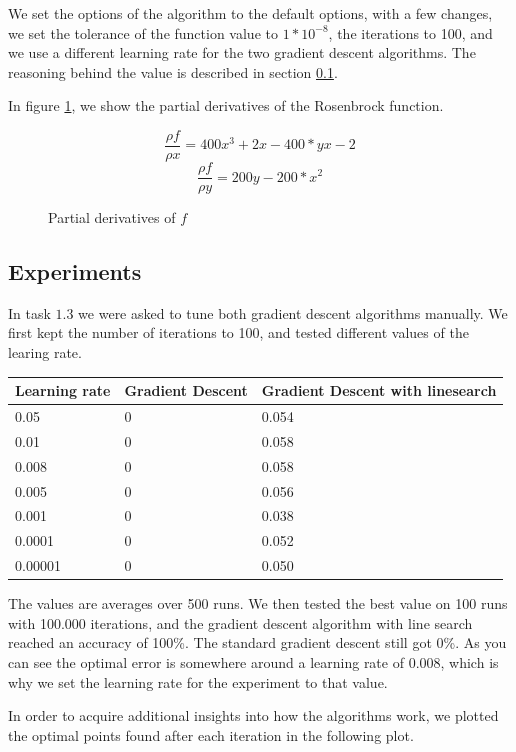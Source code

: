 \documentclass{article}
\begin{document}
We set the options of the algorithm to the default options, with a few changes, we set the tolerance of the function value to $1*10^{-8}$, the iterations to 100, and we use a different learning rate for the two gradient descent algorithms. The reasoning behind the value is described in section \ref{sec:experiments}.

In figure \ref{fig:partdiv}, we show the partial derivatives of the Rosenbrock function.
\begin{figure}[H]
\[\frac{\rho f}{\rho x} = 400x^3 + 2x - 400*yx - 2\]
\[\frac{\rho f}{\rho y} = 200y - 200*x^2\]
\caption{Partial derivatives of $f$}
\label{fig:partdiv}
\end{figure}

\subsection{Experiments}
\label{sec:experiments}
In task $1.3$ we were asked to tune both gradient descent algorithms manually. We first kept the number of iterations to 100, and tested different values of the learing rate.

\begin{table}[H]
	\centering
		\begin{tabular}{l|l|l}
		Learning rate & Gradient Descent & Gradient Descent with linesearch \\
		\hline
		0.05 & 0 & 0.054 \\
		0.01 & 0 & 0.058 \\
		0.008 & 0 & 0.058 \\
		0.005 & 0 & 0.056 \\
		0.001 & 0 & 0.038 \\
		0.0001 & 0 & 0.052 \\
		0.00001 & 0 & 0.050 \\
		\end{tabular}
\end{table}
    
The values are averages over 500 runs. We then tested the best value on 100 runs with 100.000 iterations, and the gradient descent algorithm with line search reached an accuracy of 100\%. The standard gradient descent still got 0\%.
As you can see the optimal error is somewhere around a learning rate of 0.008, which is why we set the learning rate for the experiment to that value.

In order to acquire additional insights into how the algorithms work, we plotted the optimal points found after each iteration in the following plot.
\end{document}
